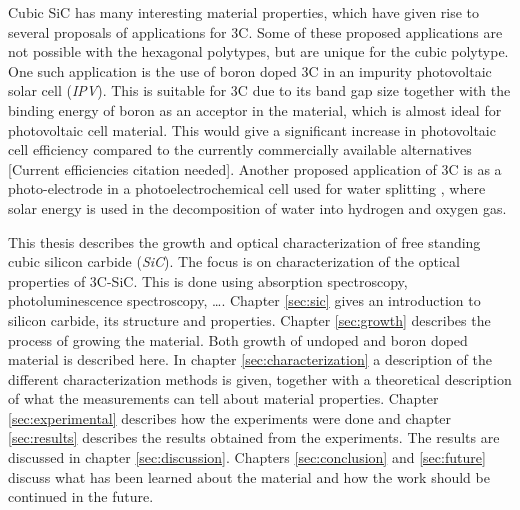 Cubic SiC has many interesting material properties, which have given rise to several proposals of applications for 3C. Some of these proposed applications are not possible with the hexagonal polytypes, but are unique for the cubic polytype. One such application is the use of boron doped 3C in an impurity photovoltaic solar cell (\emph{IPV}). This is suitable for 3C due to its band gap size together with the binding energy of boron as an acceptor in the material, which is almost ideal for photovoltaic cell material. This would give a significant increase in photovoltaic cell efficiency compared to the currently commercially available alternatives \cite{Richards2003}[Current efficiencies citation needed]. Another proposed application of 3C is as a photo-electrode in a photoelectrochemical cell used for water splitting \cite{Kato2014,Yasuda2012}, where solar energy is used in the decomposition of water into hydrogen and oxygen gas. 

This thesis describes the growth and optical characterization of free standing cubic silicon carbide (\emph{SiC}).  The focus is on characterization of the optical properties of 3C-SiC. This is done using absorption spectroscopy, photoluminescence spectroscopy, \dots. Chapter \ref{sec:sic} gives an introduction to silicon carbide, its structure and properties. Chapter \ref{sec:growth} describes the process of growing the material. Both growth of undoped and boron doped material is described here. In chapter \ref{sec:characterization} a description of the different characterization methods is given, together with a theoretical description of what the measurements can tell about material properties. Chapter \ref{sec:experimental} describes how the experiments were done and chapter \ref{sec:results} describes the results obtained from the experiments. The results are discussed in chapter \ref{sec:discussion}. Chapters \ref{sec:conclusion} and \ref{sec:future} discuss what has been learned about the material and how the work should be continued in the future. 



































